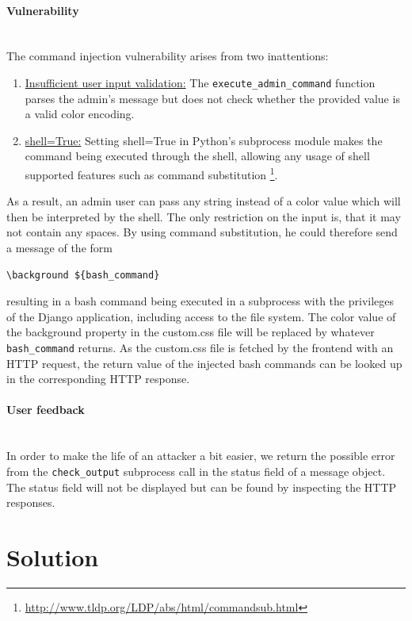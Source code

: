 \documentclass[12pt,a4paper]{article}
\newcommand{\code}[1]{\texttt{#1}}
\begin{document}
\paragraph{Vulnerability}
\noindent \\The command injection vulnerability arises from two inattentions:
\begin{enumerate}
\item \underline{Insufficient user input validation:} The \code{execute\_admin\_command} function parses the admin's message but does not check whether the provided value is a valid color encoding.
\item \underline{shell=True:} Setting shell=True in Python's subprocess module makes the command being executed through the shell, allowing any usage of shell supported features such as command substitution \footnote{\url{http://www.tldp.org/LDP/abs/html/commandsub.html}}. 
\end{enumerate}
As a result, an admin user can pass any string instead of a color value which will then be interpreted by the shell. The only restriction on the input is, that it may not contain any spaces. By using command substitution, he could therefore send a message of the form
\begin{verbatim}
\background ${bash_command}
\end{verbatim} 
resulting in a bash command being executed in a subprocess with the privileges of the Django application, including access to the file system. The color value of the background property in the custom.css file will be replaced by whatever \code{bash\_command} returns. As the custom.css file is fetched by the frontend with an HTTP request, the return value of the injected bash commands can be looked up in the corresponding HTTP response. 

\paragraph{User feedback}
\noindent \\In order to make the life of an attacker a bit easier, we return the possible error from the \code{check\_output} subprocess call in the status field of a message object.  The status field will not be displayed but can be found by inspecting the HTTP responses.



\section{Solution}
\end{document}
